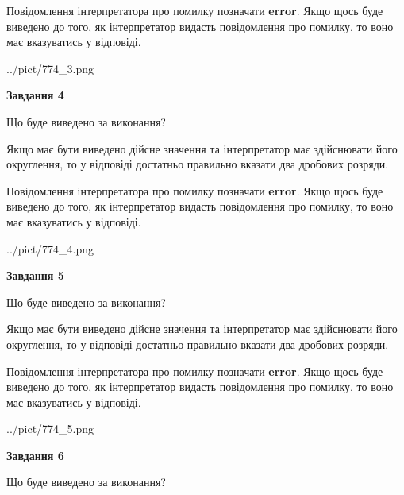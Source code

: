 \documentclass[12pt, ukrainian]{article}
\begin{document}
{\begin {Large}
Повідомлення інтерпретатора про помилку позначати \textbf{error}.
Якщо щось буде виведено до того, як інтерпретатор видасть повідомлення про помилку, 
то воно має вказуватись у відповіді. \par

\begin{center}
	{../pict/774_3.png}
\end{center}
\newpage

{\begin {center}\textbf{Завдання 4}\end {center}}\par
Що буде виведено за виконання? \par

Якщо має бути виведено дійсне значення та інтерпретатор має здійснювати його округлення, 
то у відповіді достатньо правильно вказати два дробових розряди.

Повідомлення інтерпретатора про помилку позначати \textbf{error}.
Якщо щось буде виведено до того, як інтерпретатор видасть повідомлення про помилку, 
то воно має вказуватись у відповіді. \par

\begin{center}
	{../pict/774_4.png}
\end{center}
\newpage

{\begin {center}\textbf{Завдання 5}\end {center}}\par
Що буде виведено за виконання? \par

Якщо має бути виведено дійсне значення та інтерпретатор має здійснювати його округлення, 
то у відповіді достатньо правильно вказати два дробових розряди.

Повідомлення інтерпретатора про помилку позначати \textbf{error}.
Якщо щось буде виведено до того, як інтерпретатор видасть повідомлення про помилку, 
то воно має вказуватись у відповіді. \par

\begin{center}
	{../pict/774_5.png}
\end{center}
\newpage

{\begin {center}\textbf{Завдання 6}\end {center}}\par
Що буде виведено за виконання? \par


\end{Large}}
\end{document}
